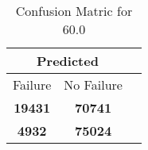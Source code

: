 \begin{table}[] 
\caption{Confusion Matric for 60.0} 
\label{Table: Prediction Accuracy-DMD60.0OnlySunEKF-ignoreReflectionEKF-top2-Reflection} 
\centering 
\begin{tabular} 
 {@{}ccc@{}} 
\toprule 
\multicolumn{2}{c}{\textbf{Predicted}}
 \\ \midrule 
\multicolumn{1}{|c|}{Failure} & 
\multicolumn{1}{c|}{No Failure}
 \\ \midrule 
\multicolumn{1}{|c|}{\color{green}\textbf{19431}} & 
\multicolumn{1}{c|}{\color{red}\textbf{70741}}
 \\ \midrule 
\multicolumn{1}{|c|}{\color{red}\textbf{4932}} & 
\multicolumn{1}{c|}{\color{green}\textbf{75024}}
 \\ \bottomrule 
\end{tabular} 
\end{table} 
